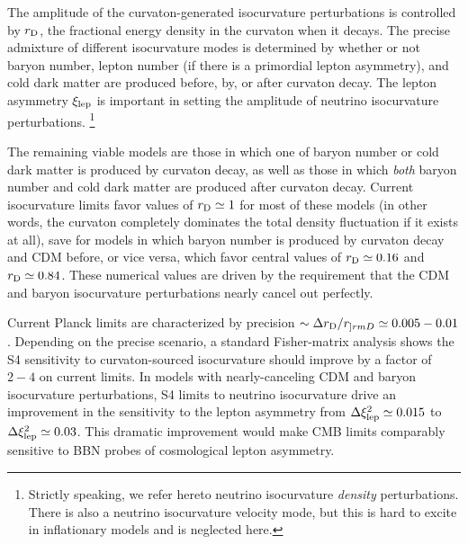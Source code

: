The amplitude of the curvaton-generated isocurvature perturbations is controlled by $r_{\rm D}$, the fractional energy density in the curvaton when it decays. The precise admixture of different isocurvature modes is determined by whether or not baryon number, lepton number (if there is a primordial lepton asymmetry), and cold dark matter are produced before, by, or after curvaton decay. The lepton asymmetry $\xi_{\rm lep}$ is important in setting the amplitude of neutrino isocurvature perturbations. \footnote{Strictly speaking, we refer hereto neutrino isocurvature \textit{density} perturbations. There is also a neutrino isocurvature velocity mode, but this is hard to excite in inflationary models and is neglected here.} %

The remaining viable models are those in which one of baryon number or cold dark matter is produced by curvaton decay, as well as those in which \textit{both} baryon number and cold dark matter are produced after curvaton decay. Current isocurvature limits favor values of $r_{\rm D}\simeq 1$ for most of these models (in other words, the curvaton completely dominates the total density fluctuation if it exists at all), save for models in which baryon number is produced by curvaton decay and CDM before, or vice versa, which favor central values of $r_{\rm D} \simeq 0.16$ and $r_{\rm D} \simeq 0.84$. These numerical values are driven by the requirement that the CDM and baryon isocurvature perturbations nearly cancel out perfectly.

Current Planck limits \cite{Smith/Grin:2015} are characterized by precision $\sim \Delta r_{\rm D}/r_{]rm D}\simeq 0.005-0.01$. Depending on the precise scenario, a standard Fisher-matrix analysis shows the S4 sensitivity to curvaton-sourced isocurvature should improve by a factor of $2-4$ on current limits. In models with nearly-canceling CDM and baryon isocurvature perturbations, S4 limits to neutrino isocurvature drive an improvement in the sensitivity to the lepton asymmetry from $\Delta \xi_{\rm lep}^{2}\simeq 0.015$ to $\Delta \xi_{\rm lep}^{2}\simeq 0.03$. This dramatic improvement would make CMB limits comparably sensitive to BBN probes of cosmological lepton asymmetry.

